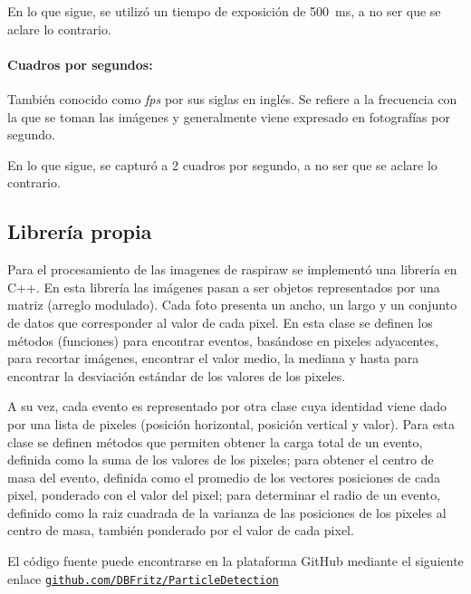 \documentclass[twoside,twocolumn]{article}
\begin{document}
        En lo que sigue, se utilizó un tiempo de exposición de \SI{500}{\milli\second}, a no ser que se aclare lo contrario.

      \paragraph{Cuadros por segundos:}
        También conocido como \emph{fps} por sus siglas en inglés.
        Se refiere a la frecuencia con la que se toman las imágenes y generalmente viene expresado en fotografías por segundo.
        
        En lo que sigue, se capturó a 2 cuadros por segundo, a no ser que se aclare lo contrario.


    \subsection{Librería propia}\label{sec:conf_exp:library}
      Para el procesamiento de las imagenes de raspiraw se implementó una librería en C++. En esta librería las imágenes pasan
      a ser objetos representados por una matriz (arreglo modulado). Cada foto presenta un ancho, un largo y un conjunto de datos que
      corresponder al valor de cada pixel. En esta clase se definen los métodos (funciones) para encontrar eventos, basándose en
      pixeles adyacentes, para recortar imágenes, encontrar el valor medio, la mediana y hasta para encontrar
      la desviación estándar de los valores de los pixeles.

      A su vez, cada evento es representado por otra clase cuya identidad viene dado por una lista de pixeles (posición horizontal,
      posición vertical y valor). Para esta clase se definen métodos que permiten
      obtener la carga total de un evento, definida como la suma de los valores de los pixeles;
      para obtener el centro de masa del evento,
      definida como el promedio de los vectores posiciones de cada pixel,
      ponderado con el valor del pixel;
      para determinar el radio de un evento, definido como la raiz cuadrada de la varianza de las posiciones
      de los pixeles al centro de masa, también ponderado por el valor de cada pixel.

      El código fuente puede encontrarse en la plataforma GitHub mediante el siguiente enlace
      \href{https://github.com/DBFritz/ParticleDetections}{\texttt{github.com/DBFritz/ParticleDetection}}
\end{document}
